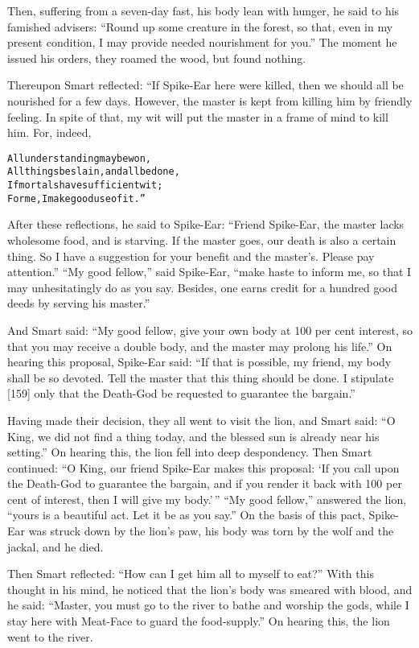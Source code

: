 \documentclass{article}
\renewenvironment{verbatim}{\begin{alltt}\normalfont\begin{centering}}{\end{centering}\end{alltt}}
\begin{document}
Then, suffering from a seven-day fast, his body lean with hunger,
he said to his famished advisers:
``Round up some creature in the forest, so that, even in my present condition, I may provide needed nourishment for you.''
The moment he issued his orders, they roamed the wood, but found
nothing.

Thereupon Smart reflected: “If Spike-Ear here were killed, then we
should all be nourished for a few days. However, the master is kept
from killing him by friendly feeling. In spite of that, my wit will
put the master in a frame of mind to kill him. For, indeed,

\begin{verbatim}
All understanding may be won,
All things be slain, and all be done,
If mortals have sufficient wit;
For me, I make good use of it.”
\end{verbatim}
After these reflections, he said to Spike-Ear:
``Friend Spike-Ear, the master lacks wholesome food, and is starving. If the master goes, our death is also a certain thing. So I have a suggestion for your benefit and the master's. Please pay attention.''
``My good fellow,'' said Spike-Ear,
``make haste to inform me, so that I may unhesitatingly do as you say. Besides, one earns credit for a hundred good deeds by serving his master.''

And Smart said:
``My good fellow, give your own body at 100 per cent interest, so that you may receive a double body, and the master may prolong his life.''
On hearing this proposal, Spike-Ear said:
``If that is possible, my friend, my body shall be so devoted. Tell the master that this thing should be done. I stipulate [159] only that the Death-God be requested to guarantee the bargain.''

Having made their decision, they all went to visit the lion, and
Smart said:
``O King, we did not find a thing today, and the blessed sun is already near his setting.''
On hearing this, the lion fell into deep despondency. Then Smart
continued:
``O King, our friend Spike-Ear makes this proposal: `If you call upon the Death-God to guarantee the bargain, and if you render it back with 100 per cent of interest, then I will give my body.'\,''
``My good fellow,'' answered the lion,
``yours is a beautiful act. Let it be as you say.'' On the basis of
this pact, Spike-Ear was struck down by the lion's paw, his body
was torn by the wolf and the jackal, and he died.

Then Smart reflected: ``How can I get him all to myself to eat?''
With this thought in his mind, he noticed that the lion's body was
smeared with blood, and he said:
``Master, you must go to the river to bathe and worship the gods, while I stay here with Meat-Face to guard the food-supply.''
On hearing this, the lion went to the river.
\end{document}
